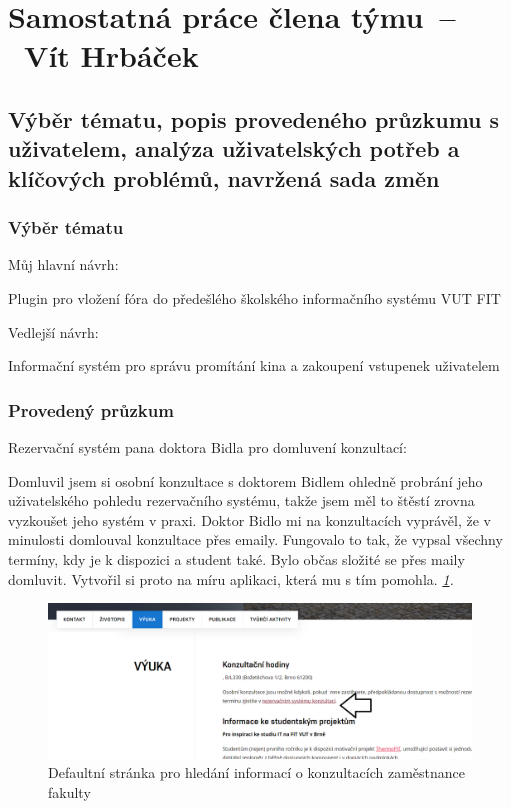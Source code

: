 \section{Samostatná práce člena týmu\ --\ Vít Hrbáček}
\label{sec:individual_work_vit}

\subsection{Výběr tématu, popis provedeného průzkumu s uživatelem, analýza uživatelských potřeb a klíčových problémů, navržená sada změn}

\subsubsection*{Výběr tématu}

{\large Můj hlavní návrh:}

Plugin pro vložení fóra do předešlého školského informačního systému VUT FIT


{\noindent \large Vedlejší návrh:}

Informační systém pro správu promítání kina a zakoupení vstupenek uživatelem

\subsubsection*{Provedený průzkum}

{ \noindent \large Rezervační systém pana doktora Bidla pro domluvení konzultací:}

Domluvil jsem si osobní konzultace s doktorem Bidlem ohledně probrání jeho uživatelského pohledu rezervačního systému, takže jsem měl to štěstí zrovna vyzkoušet jeho systém v praxi. Doktor Bidlo mi na konzultacích vyprávěl, že v minulosti domlouval konzultace přes emaily. Fungovalo to tak, že vypsal všechny termíny, kdy je k dispozici a student také. Bylo občas složité se přes maily domluvit. Vytvořil si proto na míru aplikaci, která mu s tím pomohla. 
\noindent\emph{ \ref{fig:Vit_n}.}

\begin{figure}[htbp]
    \centering
    \includegraphics[width = \textwidth]{doc/latex/fig/vit/1.png}
    \caption{Defaultní stránka pro hledání informací o konzultacích zaměstnance fakulty}
    \label{fig:Vit_n}
\end{figure}



